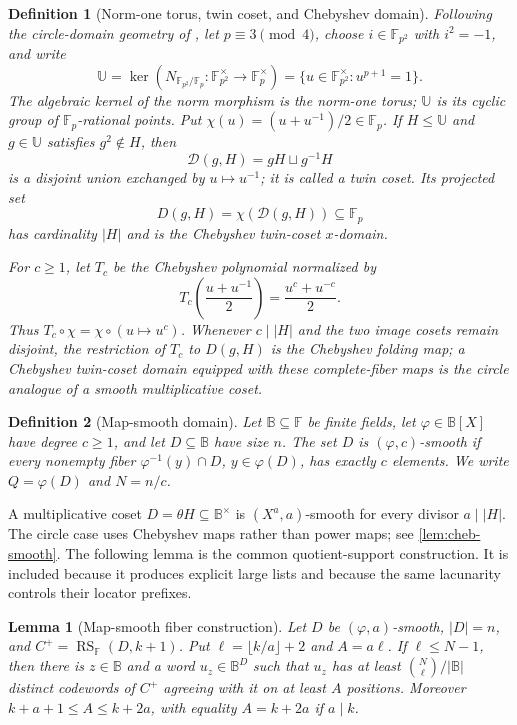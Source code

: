 \documentclass[11pt,a4paper]{amsart}
\numberwithin{equation}{section}
\newtheorem{lemma}[lemma]{Lemma}
\newtheorem{definition}[definition]{Definition}
\theoremstyle{remark}
\DeclareMathOperator{\RS}{RS}
\newcommand{\F}{\mathbb F}
\newcommand{\B}{\mathbb B}
\newcommand{\Dcal}{\mathcal D}
\newcommand{\UU}{\mathbb U}
\newcommand{\abs}[1]{\lvert #1\rvert}
\begin{document}
\begin{definition}[Norm-one torus, twin coset, and Chebyshev domain]
\label{def:circle-twin-domain}
Following the circle-domain geometry of \cite{HLP24}, let
\(p\equiv3\pmod4\), choose \(i\in\F_{p^2}\) with \(i^2=-1\), and
write
\[
 \UU=\ker\!\left(N_{\F_{p^2}/\F_p}:\F_{p^2}^{\times}
                      \to\F_p^\times\right)
     =\{u\in\F_{p^2}^{\times}:u^{p+1}=1\}.
\]
The algebraic kernel of the norm morphism is the
\emph{norm-one torus}; \(\UU\) is its cyclic group of
\(\F_p\)-rational points.  Put
\(\chi(u)=(u+u^{-1})/2\in\F_p\).  If \(H\le\UU\) and
\(g\in\UU\) satisfies \(g^2\notin H\), then
\[
 \Dcal(g,H)=gH\sqcup g^{-1}H
\]
is a disjoint union exchanged by \(u\mapsto u^{-1}\); it is called a
\emph{twin coset}.  Its projected set
\[
             D(g,H)=\chi(\Dcal(g,H))\subseteq\F_p
\]
has cardinality \(\abs H\) and is the \emph{Chebyshev twin-coset
\(x\)-domain}.

For \(c\ge1\), let \(T_c\) be the Chebyshev polynomial normalized by
\[
       T_c\!\left(\frac{u+u^{-1}}2\right)
       =\frac{u^c+u^{-c}}2 .
\]
Thus \(T_c\circ\chi=\chi\circ(u\mapsto u^c)\).  Whenever
\(c\mid\abs H\) and the two image cosets remain disjoint, the restriction
of \(T_c\) to \(D(g,H)\) is the \emph{Chebyshev folding map}; a
Chebyshev twin-coset domain equipped with these complete-fiber maps is
the circle analogue of a smooth multiplicative coset.
\end{definition}

\begin{definition}[Map-smooth domain]\label{def:map-smooth}
Let \(\B\subseteq\F\) be finite fields, let \(\varphi\in\B[X]\) have
degree \(c\ge1\), and let \(D\subseteq\B\) have size \(n\).  The set
\(D\) is \((\varphi,c)\)-smooth if every nonempty fiber
\(\varphi^{-1}(y)\cap D\), \(y\in\varphi(D)\), has exactly \(c\)
elements.  We write \(Q=\varphi(D)\) and \(N=n/c\).
\end{definition}

A multiplicative coset \(D=\theta H\subseteq\B^\times\) is \((X^a,a)\)-smooth for every divisor \(a\mid\abs H\).  The circle case uses Chebyshev maps rather than power maps; see \cref{lem:cheb-smooth}.  The following lemma is the common quotient-support construction.  It is included because it produces explicit large lists and because the same lacunarity controls their locator prefixes.

\begin{lemma}[Map-smooth fiber construction]\label{lem:map-smooth-fiber}
Let \(D\) be \((\varphi,a)\)-smooth, \(\abs D=n\), and \(C^+=\RS_\F(D,k+1)\).  Put \(\ell=\lfloor k/a\rfloor+2\) and \(A=a\ell\).  If \(\ell\le N-1\), then there is \(z\in\B\) and a word \(u_z\in\B^D\) such that \(u_z\) has at least \(\binom N\ell/\abs\B\) distinct codewords of \(C^+\) agreeing with it on at least \(A\) positions.  Moreover \(k+a+1\le A\le k+2a\), with equality \(A=k+2a\) if \(a\mid k\).
\end{lemma}
\end{document}

